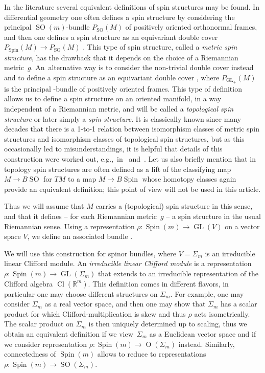 \documentclass[11pt]{article}
\numberwithin{equation}{section}
\newcommand\ceq{\coloneqq}
\let\witi\widetilde
\newcommand\Cl{\mathop{\mathrm{Cl}}}
\newcommand\<{\langle}
\renewcommand\>{\rangle}
\newcommand{\RR}{\mathbb R}
\newcommand{\GL}{{\operatorname{GL}}}
\newcommand{\O}{{\operatorname{O}}}
\newcommand{\SO}{{\operatorname{SO}}}
\newcommand{\Spin}{{\operatorname{Spin}}}
\theoremstyle{definition}
\let\define\emph
\newcommand\eg{e.g.,\ \ignorespaces}
\newcommand\={\,=\,}
\numberwithin{equation}{section}
\begin{document}
In the literature several equivalent definitions of spin structures may be found.
In differential geometry one often defines a spin structure by considering the principal $\SO(m)$-bundle $P_\SO(M)$ of positively oriented orthonormal frames, and then one defines a spin structure as an equivariant double cover $P_\Spin(M) \to P_\SO(M)$ \cite{friedrich-book,lawson.michelsohn:89}.
This type of spin structure, called a \define{metric spin structure}, has the drawback that it depends on the choice of a Riemannian metric~$g$.
An~alternative way is to consider the non-trivial double cover \smash{$\witi\GL_+(m,\RR)\to \GL_+(m,\RR)$} instead and to define a spin structure as an equivariant double cover \smash{$P_{\witi\GL_+}(M) \to P_{\GL_+}(M)$}, where $P_{\GL_+}(M)$ is the principal \smash{$\GL_+(m,\RR)$}-bundle of positively oriented frames. This type of definition allows us to define a spin structure on an oriented manifold, in a way independent of a Riemannian metric, and will be called a \define{topological spin structure} or later simply a \define{spin structure}.
It is classically known since many decades that there is a 1-to-1 relation between isomorphism classes of metric spin structures and isomorphism classes of topological spin structures, but as this occasionally led to misunderstandings, it is helpful that details of this construction were worked out, \eg in~\cite{swift-parttwo} and~\cite[Section~2.2]{ammann.humbert:2008}.
Let us also briefly mention that in topology spin structures are often defined as a lift of the classifying map $M\to B\SO$ for $TM$ to a map $M\to B\Spin$ whose homotopy classes again provide an equivalent definition; this point of view will not be used in this article.

Thus we will assume that $M$ carries a (topological) spin structure in this sense, and that it defines -- for each Riemannian metric~$g$ -- a spin structure \smash{$P_\Spin^g(M) \to P_\SO^g(M)$} in the usual Riemannian sense. Using a representation
$\rho\colon\Spin(m)\to \GL(V)$ on a vector space $V$,
we define an associated bundle \smash{$V^gM\ceq P_\Spin^g(M) \times_\rho V$}.

We will use this construction for spinor bundles, where $V= \Sigma_m$ is an irreducible linear Clifford module.
An \define{irreducible linear Clifford module} is a representation $\rho\colon\Spin(m)\to \GL(\Sigma_m)$ that extends to an irreducible representation of the Clifford algebra $\Cl(\RR^m)$.
This definition comes in different flavors, in particular one may choose different structures on $\Sigma_m$. For example, one may consider $\Sigma_m$ as a real vector space, and then one may show that $\Sigma_m$ has a scalar product for which Clifford-multiplication is skew and thus $\rho$ acts isometrically.
The scalar product on $\Sigma_m$ is then uniquely determined up to scaling, thus we obtain an equivalent definition if we view~$\Sigma_m$ as a Euclidean vector space and if we consider representation $\rho\colon\Spin(m)\to \O(\Sigma_m)$ instead. Similarly, connectedness of $\Spin(m)$ allows to reduce to representations $\rho\colon\Spin(m)\to \SO(\Sigma_m)$.
\end{document}
